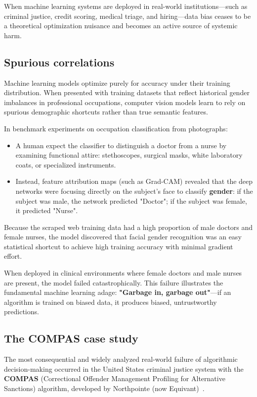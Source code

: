 When machine learning systems are deployed in real-world institutions—such as criminal justice, credit scoring, medical triage, and hiring—data bias ceases to be a theoretical optimization nuisance and becomes an active source of systemic harm.

\subsection{Spurious correlations}
\label{sec:spurious_shortcuts}

Machine learning models optimize purely for accuracy under their training distribution. When presented with training datasets that reflect historical gender imbalances in professional occupations, computer vision models learn to rely on spurious demographic shortcuts rather than true semantic features.

In benchmark experiments on occupation classification from photographs:
\begin{itemize}[noitemsep]
  \item A human expect the classifier to distinguish a doctor from a nurse by examining functional attire: stethoscopes, surgical masks, white laboratory coats, or specialized instruments.
  \item Instead, feature attribution maps (such as Grad-CAM) revealed that the deep networks were focusing directly on the subject's face to classify \textbf{gender}: if the subject was male, the network predicted "Doctor"; if the subject was female, it predicted "Nurse".
\end{itemize}
Because the scraped web training data had a high proportion of male doctors and female nurses, the model discovered that facial gender recognition was an easy statistical shortcut to achieve high training accuracy with minimal gradient effort. 

When deployed in clinical environments where female doctors and male nurses are present, the model failed catastrophically. This failure illustrates the fundamental machine learning adage: \textbf{"Garbage in, garbage out"}—if an algorithm is trained on biased data, it produces biased, untrustworthy predictions.

\subsection{The COMPAS case study}
\label{sec:compas_case_study}

The most consequential and widely analyzed real-world failure of algorithmic decision-making occurred in the United States criminal justice system with the \textbf{COMPAS} (Correctional Offender Management Profiling for Alternative Sanctions) algorithm, developed by Northpointe (now Equivant)~\cite{angwin2016machine}.

